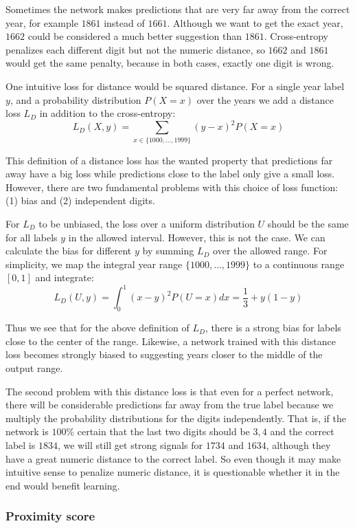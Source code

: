Sometimes the network makes predictions that are very far away from the correct year, for example $1861$ instead of $1661$. Although we want to get the exact year, $1662$ could be considered a much better suggestion than $1861$. Cross-entropy penalizes each different digit but not the numeric distance, so $1662$ and $1861$ would get the same penalty, because in both cases, exactly one digit is wrong.

One intuitive loss for distance would be squared distance. For a single year label $y$, and a probability distribution $P(X=x)$ over the years we add a distance loss $L_D$ in addition to the cross-entropy:
\[
L_D(X, y) = \sum_{x \in \{1000, \ldots, 1999\}} (y-x)^2 P(X=x)
\]

This definition of a distance loss has the wanted property that predictions far away have a big loss while predictions close to the label only give a small loss. However, there are two fundamental problems with this choice of loss function: (1) bias and (2) independent digits.

For $L_D$ to be unbiased, the loss over a uniform distribution $U$ should be the same for all labels $y$ in the allowed interval. However, this is not the case. We can calculate the bias for different $y$ by summing $L_D$ over the allowed range. For simplicity, we map the integral year range $\{ 1000, \ldots, 1999 \}$ to a continuous range $[0,1]$ and integrate:
\[
L_D(U, y) = \int_0^1 (x-y)^2 P(U=x) dx = \frac{1}{3} + y(1-y)
\]

Thus we see that for the above definition of $L_D$, there is a strong bias for labels close to the center of the range. Likewise, a network trained with this distance loss becomes strongly biased to suggesting years closer to the middle of the output range.


The second problem with this distance loss is that even for a perfect network, there will be considerable predictions far away from the true label because we multiply the probability distributions for the digits independently. That is, if the network is $100\%$ certain that the last two digits should be $3, 4$ and the correct label is $1834$, we will still get strong signals for $1734$ and $1634$, although they have a great numeric distance to the correct label.
So even though it may make intuitive sense to penalize numeric distance, it is questionable whether it in the end would benefit learning.

\subsubsection{Proximity score}

